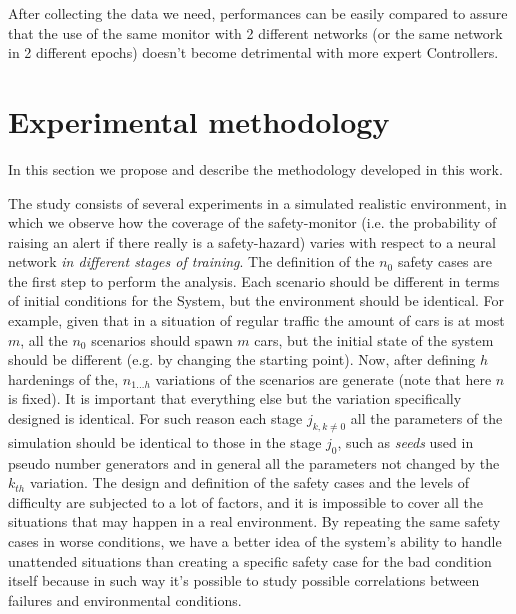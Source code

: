 After collecting the data we need, performances can be easily compared to assure that the use of the same monitor with 2 different networks (or the same network in 2 different epochs) doesn't become detrimental with more expert Controllers.

\section{Experimental methodology}

In this section we propose and describe the methodology developed in this work.\newline

The study consists of several experiments in a simulated realistic environment, in which we observe how the coverage of the safety-monitor (i.e. the probability of raising an alert if there really is a safety-hazard) varies with respect to a neural network \textsl{in different stages of training}.\newline
The definition of the $n_{0}$ safety cases are the first step to perform the analysis. Each scenario should be different in terms of initial conditions for the System, but the environment should be identical. For example, given that in a situation of regular traffic the amount of cars is at most $m$, all the $n_{0}$ scenarios should spawn $m$ cars, but the initial state of the system should be different (e.g. by changing the starting point). Now, after defining $h$ hardenings of the, $n_{1\dots h}$ variations of the scenarios are generate (note that here $n$ is fixed). It is important that everything else but the variation specifically designed is identical. For such reason each stage $j_{k, k\neq 0}$ all the parameters of the simulation should be identical to those in the stage $j_{0}$, such as \textsl{seeds} used in pseudo number generators and in general all the parameters not changed by the $k_{th}$ variation.\newline
The design and definition of the safety cases and the levels of difficulty are subjected to a lot of factors, and it is impossible to cover all the situations that may happen in a real environment. By repeating the same safety cases in worse conditions, we have a better idea of the system's ability to handle unattended situations than creating a specific safety case for the bad condition itself because in such way it's possible to study possible correlations between failures and environmental conditions.\newline
\newpage

